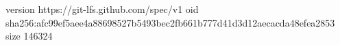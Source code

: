 version https://git-lfs.github.com/spec/v1
oid sha256:afc99ef5aee4a88698527b5493bec2fb661b777d41d3d12aecacda48efea2853
size 146324
